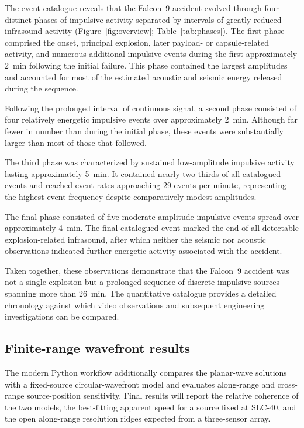 \documentclass[]{seismica}
\begin{document}
The event catalogue reveals that the Falcon~9 accident evolved through four
distinct phases of impulsive activity separated by intervals of greatly reduced
infrasound activity (Figure~\ref{fig:overview}; Table~\ref{tab:phases}). The
first phase comprised the onset, principal explosion, later payload- or
capsule-related activity, and numerous additional impulsive events during the
first approximately 2~min following the initial failure. This phase contained the largest amplitudes and accounted for most of the estimated acoustic and seismic energy released during the sequence.

Following the prolonged interval of continuous signal, a second phase consisted of four relatively energetic impulsive events over approximately 2~min. Although far fewer in number than during the initial phase, these events were substantially larger than most of those that followed.

The third phase was characterized by sustained low-amplitude impulsive activity lasting approximately 5~min. It contained nearly two-thirds of all catalogued events and reached event rates approaching 29 events per minute, representing the highest event frequency despite comparatively modest amplitudes.

The final phase consisted of five moderate-amplitude impulsive events spread over approximately 4~min. The final catalogued event marked the end of all detectable explosion-related infrasound, after which neither the seismic nor acoustic observations indicated further energetic activity associated with the accident.

Taken together, these observations demonstrate that the Falcon~9 accident was not a single explosion but a prolonged sequence of discrete impulsive sources spanning more than 26~min. The quantitative catalogue provides a detailed chronology against which video observations and subsequent engineering investigations can be compared.

\subsection{Finite-range wavefront results}
\label{sec:results_finite_range}

The modern Python workflow additionally compares the planar-wave solutions with a fixed-source circular-wavefront model and evaluates along-range and cross-range source-position sensitivity. Final results will report the relative coherence of the two models, the best-fitting apparent speed for a source fixed at SLC-40, and the open along-range resolution ridges expected from a three-sensor array.
\end{document}
